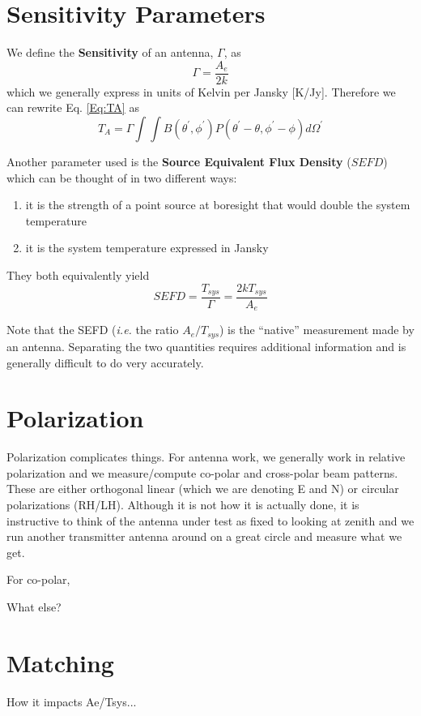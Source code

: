 \documentclass[11pt]{article}
\begin{document}
\section{Sensitivity Parameters}
We define the {\bf Sensitivity} of an antenna, $\Gamma$, as
\begin{equation}
\Gamma = \frac{A_e}{2k}
\end{equation}
which we generally express in units of Kelvin per Jansky [K/Jy].  Therefore we can rewrite Eq. \ref{Eq:TA} as
\begin{equation}
T_A =  \Gamma \int \int B(\theta^\prime,\phi^\prime)P(\theta^\prime-\theta,\phi^\prime-\phi)d\Omega^\prime
\end{equation}

Another parameter used is the {\bf Source Equivalent Flux Density} ($SEFD$) which can be thought of in two different ways:
\begin{enumerate}
	\item it is the strength of a point source at boresight that would double the system temperature
	\item it is the system temperature expressed in Jansky
\end{enumerate}
They both equivalently yield
\begin{equation}
SEFD = \frac{T_{sys}}{\Gamma} = \frac{2kT_{sys}}{A_e}
\end{equation}

Note that the SEFD ({\em i.e.} the ratio $A_e/T_{sys}$) is the ``native'' measurement made by an antenna.  Separating the two quantities requires additional information and is generally difficult to do very accurately. 

\section{Polarization}
Polarization complicates things.  For antenna work, we generally work in relative polarization and we measure/compute co-polar and cross-polar beam patterns.  These are either orthogonal linear (which we are denoting E and N) or circular polarizations (RH/LH).
Although it is not how it is actually done, it is instructive to think of the antenna under test as fixed to looking at zenith and we run another transmitter antenna around on a great circle and measure what we get.

For co-polar, 

What else?

\section{Matching}
How it impacts Ae/Tsys...
\end{document}
